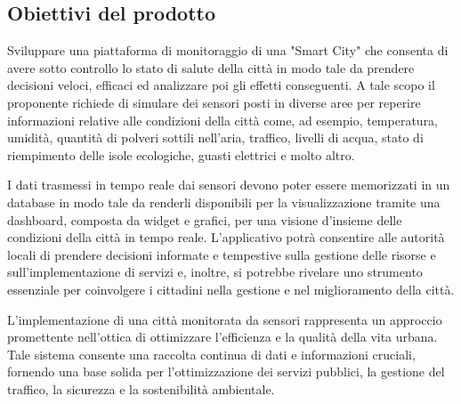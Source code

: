 \subsection{Obiettivi del prodotto}
Sviluppare una piattaforma di monitoraggio di una "Smart City" che consenta di avere sotto
controllo lo stato di salute della città in modo tale da prendere decisioni veloci, efficaci
ed analizzare poi gli effetti conseguenti.  
A tale scopo il proponente richiede di simulare dei sensori posti in diverse aree per reperire
informazioni relative alle condizioni della città come, ad esempio, temperatura, umidità,
quantità di polveri sottili nell’aria, traffico, livelli di acqua, stato di riempimento delle isole ecologiche,
guasti elettrici e molto altro.  

I dati trasmessi in tempo reale dai sensori devono poter essere memorizzati in un database
in modo tale da renderli disponibili per la visualizzazione tramite una dashboard, composta da widget e grafici, per una visione d’insieme delle condizioni della città in
tempo reale.  
L’applicativo potrà consentire alle autorità locali di prendere decisioni informate e tempestive sulla gestione delle risorse e sull’implementazione di servizi e, inoltre, si potrebbe
rivelare uno strumento essenziale per coinvolgere i cittadini nella gestione e nel miglioramento della città.
\vspace{0.3cm}  

L’implementazione di una città monitorata da sensori rappresenta un approccio promettente nell’ottica di ottimizzare l’efficienza e la qualità della vita urbana. Tale sistema consente
una raccolta continua di dati e informazioni cruciali, fornendo una base solida per l’ottimizzazione dei servizi pubblici, la gestione del traffico, la sicurezza e la sostenibilità ambientale.  

